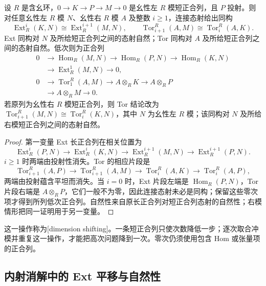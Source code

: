 \begin{theorem}[基础维数平移]\label{b4:thm:dimension-shift-basic}
	设 \(R\) 是含幺环，\(0\to K\to P\to M\to0\) 是幺性左 \(R\) 模短正合列，且 \(P\) 投射。则对任意幺性左 \(R\) 模 \(N\)、幺性右 \(R\) 模 \(A\) 及整数 \(i\ge1\)，连接态射给出同构
	\[
		\operatorname{Ext}_R^i(K,N)\cong\operatorname{Ext}_R^{i+1}(M,N), \qquad \operatorname{Tor}_{i+1}^R(A,M)\cong\operatorname{Tor}_i^R(A,K).
	\]
	Ext 同构对 \(N\) 及所给短正合列之间的态射自然；Tor 同构对 \(A\) 及所给短正合列之间的态射自然。低次则为正合列
	\[
		\begin{aligned}
			0&\longrightarrow\operatorname{Hom}_R(M,N)\longrightarrow\operatorname{Hom}_R(P,N) \longrightarrow\operatorname{Hom}_R(K,N)\\
			&\longrightarrow\operatorname{Ext}_R^1(M,N)\longrightarrow0,\\
			0&\longrightarrow\operatorname{Tor}_1^R(A,M)\longrightarrow A\otimes_RK \longrightarrow A\otimes_RP\\
			&\longrightarrow A\otimes_RM\longrightarrow0.
		\end{aligned}
	\]
	若原列为幺性右 \(R\) 模短正合列，则 Tor 结论改为 \(\operatorname{Tor}_{i+1}^R(M,N)\cong\operatorname{Tor}_i^R(K,N)\)，其中 \(N\) 为幺性左 \(R\) 模；该同构对 \(N\) 及所给右模短正合列之间的态射自然。
\end{theorem}
\begin{proof}
	第一变量 Ext 长正合列在相关位置为
	\[
		\operatorname{Ext}_R^i(P,N)\longrightarrow\operatorname{Ext}_R^i(K,N) \longrightarrow\operatorname{Ext}_R^{i+1}(M,N) \longrightarrow\operatorname{Ext}_R^{i+1}(P,N).
	\]
	\(i\ge1\) 时两端由投射性消失。Tor 的相应片段是
	\[
		\operatorname{Tor}_{i+1}^R(A,P)\longrightarrow\operatorname{Tor}_{i+1}^R(A,M) \longrightarrow\operatorname{Tor}_i^R(A,K)\longrightarrow\operatorname{Tor}_i^R(A,P),
	\]
	两端由投射蕴含平坦而消失。当 \(i=0\) 时，Ext 片段左端是 \(\operatorname{Hom}_R(P,N)\)，Tor 片段右端是 \(A\otimes_RP\)，它们一般不为零，因此连接态射未必是同构；保留这些零次项才得到所列低次正合列。自然性来自原长正合列对短正合列态射的自然性；右模情形把同一证明用于另一变量。
\end{proof}

这一操作称为[dimension shifting]。一条短正合列只使次数降低一步；逐次取合冲模并重复这一操作，才能把高次问题降到一次。零次仍须使用包含 Hom 或张量项的正合列。

\subsection{内射消解中的 Ext 平移与自然性}
\label{b4:subsec:0805:02}

